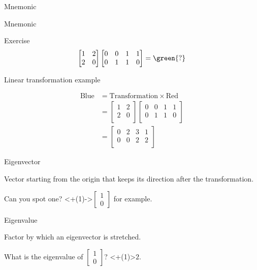 \begin{frame}{Mnemonic}

\end{frame}

\begin{frame}{Mnemonic}

\end{frame}

\begin{frame}{Exercise}
  \[
    \begin{bmatrix}
      1 & 2 \\
      2 & 0 \\
    \end{bmatrix}
    \begin{bmatrix}
      0 & 0 & 1 & 1 \\
      0 & 1 & 1 & 0 \\
    \end{bmatrix}
    = \green{?}
  \]
\end{frame}

\begin{frame}{Linear transformation example}

  \[
    \begin{aligned}
      \text{Blue} & = \text{Transformation} \times \text{Red} \\
      & = \begin{bmatrix}
        1 & 2 \\
        2 & 0 \\
      \end{bmatrix}
      \begin{bmatrix}
        0 & 0 & 1 & 1 \\
        0 & 1 & 1 & 0 \\
      \end{bmatrix} \\
      & = \begin{bmatrix}
        0 & 2 & 3 & 1 \\
        0 & 0 & 2 & 2 \\
      \end{bmatrix}
    \end{aligned}
  \]
\end{frame}

\begin{frame}{Eigenvector}


  Vector starting from the origin that keeps its direction after the transformation.

  \alert{Can you spot one?}
  \visible<+(1)->{$\begin{bmatrix}1 \\0\end{bmatrix}$ for example.}
\end{frame}

\begin{frame}{Eigenvalue}


  Factor by which an eigenvector is stretched.

  \alert{What is the eigenvalue of $\begin{bmatrix}1 \\ 0\end{bmatrix}$?}
  \visible<+(1)>{$2$.}
\end{frame}
